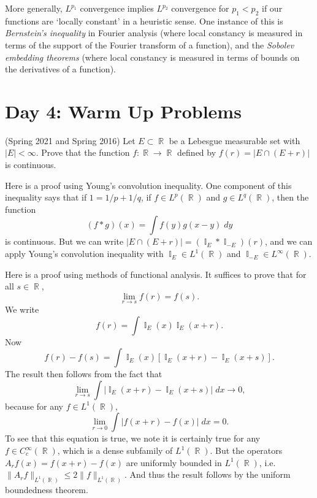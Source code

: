 \documentclass[answers]{exam}
\DeclareMathOperator{\RR}{\mathbb{R}}
\DeclareMathOperator{\II}{\mathbb{I}}
\begin{document}
\begin{questions}
More generally, $L^{p_1}$ convergence implies $L^{p_2}$ convergence for $p_1 < p_2$ if our functions are `locally constant' in a heuristic sense. One instance of this is \emph{Bernstein's inequality} in Fourier analysis (where local constancy is measured in terms of the support of the Fourier transform of a function), and the \emph{Sobolev embedding theorems} (where local constancy is measured in terms of bounds on the derivatives of a function).



\newpage
\section{Day 4: Warm Up Problems}    

\question  (Spring 2021 and Spring 2016)
  Let $E \subset \RR$ be a Lebesgue measurable set with $|E|<\infty$. Prove that the function $f:\RR\to \RR$ defined by $f(r)= |E\cap (E+r)|$ is continuous.
\begin{solution}
	Here is a proof using Young's convolution inequality. One component of this inequality says that if $1 = 1/p + 1/q$, if $f \in L^p(\RR)$ and $g \in L^q(\RR)$, then the function
	\[ (f * g)(x) = \int f(y) g(x - y)\; dy \]
	is continuous. But we can write $|E \cap (E + r)| = (\II_E * \II_{-E})(r)$, and we can apply Young's convolution inequality with $\II_E \in L^1(\RR)$ and $\II_{-E} \in L^\infty(\RR)$.

    Here is a proof using methods of functional analysis. It suffices to prove that for all $s \in \RR$,
    \[ \lim_{r \to s} f(r) = f(s). \]
    We write
    \[ f(r) = \int \II_E(x) \II_E(x + r). \]
    Now
    \[ f(r) - f(s) = \int \II_E(x) [\II_E(x + r) - \II_E(x + s)]. \]
    The result then follows from the fact that
    \[ \lim_{r \to s} \int | \II_E(x + r) - \II_E(x + s)|\; dx \to 0, \]
    because for any $f \in L^1(\RR)$,
    \[ \lim_{r \to 0} \int |f(x + r) - f(x)|\; dx = 0. \]
    To see that this equation is true, we note it is certainly true for any $f \in C_c^\infty(\RR)$, which is a dense subfamily of $L^1(\RR)$. But the operators $A_r f(x) = f(x + r) - f(x)$ are uniformly bounded in $L^1(\RR)$, i.e. $\| A_r f \|_{L^1(\RR)} \leq 2 \| f \|_{L^1(\RR)}$. And thus the result follows by the uniform boundedness theorem.


\end{solution}
\end{questions}
\end{document}
